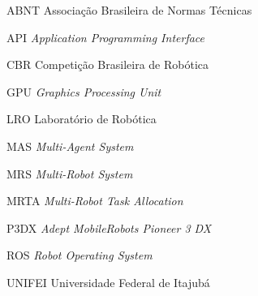 \renewcommand{\nomname}{\listadesiglasname}
\pdfbookmark[0]{\nomname}{las}
\cleardoublepage
\begin{siglas}
    \item[ABNT] Associação Brasileira de Normas Técnicas
    \item[API] \textit{Application Programming Interface}
    \item[CBR] Competição Brasileira de Robótica
    \item[GPU] \textit{Graphics Processing Unit}
    \item[LRO] Laboratório de Robótica
    \item[MAS] \textit{Multi-Agent System}
    \item[MRS] \textit{Multi-Robot System}
    \item[MRTA] \textit{Multi-Robot Task Allocation}
    \item[P3DX] \textit{Adept MobileRobots Pioneer 3 DX}
    \item[ROS] \textit{Robot Operating System}
    \item[UNIFEI] Universidade Federal de Itajubá
\end{siglas}